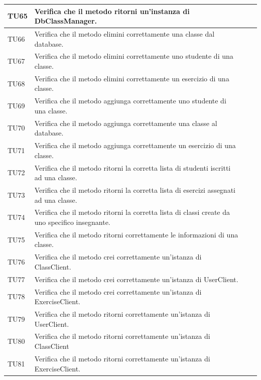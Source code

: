 \begin{longtable}{|>{\centering\arraybackslash}m{1.6cm}|>{\centering\arraybackslash}m{6.41cm}|>{\centering\arraybackslash}m{3.1cm}| c |}
		TU65 & Verifica che il metodo ritorni un'instanza di DbClassManager.  \\ \hline
		TU66 & Verifica che il metodo elimini correttamente una classe dal database.  \\ \hline
		TU67 & Verifica che il metodo elimini correttamente uno studente di una classe.  \\ \hline
		TU68 & Verifica che il metodo elimini correttamente un esercizio di una classe.  \\ \hline
		TU69 & Verifica che il metodo aggiunga correttamente uno studente di una classe.  \\ \hline
		TU70 & Verifica che il metodo aggiunga correttamente una classe al database. \\ \hline
		TU71 & Verifica che il metodo aggiunga correttamente un esercizio di una classe.  \\ \hline
		TU72 & Verifica che il metodo ritorni la corretta lista di studenti iscritti ad una classe.  \\ \hline
		TU73 & Verifica che il metodo ritorni la corretta lista di esercizi assegnati ad una classe.  \\ \hline
		TU74 & Verifica che il metodo ritorni la corretta lista di classi create da uno specifico insegnante.  \\ \hline
		TU75 & Verifica che il metodo ritorni correttamente le informazioni di una classe.  \\ \hline
		
		TU76 & Verifica che il metodo crei correttamente un'istanza di ClassClient.  \\ \hline
		TU77 & Verifica che il metodo crei correttamente un'istanza di UserClient.  \\ \hline
		TU78 & Verifica che il metodo crei correttamente un'istanza di ExerciseClient.  \\ \hline
		TU79 & Verifica che il metodo ritorni correttamente un'istanza di UserClient.  \\ \hline
		TU80 & Verifica che il metodo ritorni correttamente un'istanza di ClassClient  \\ \hline
		TU81 & Verifica che il metodo ritorni correttamente un'istanza di ExerciseClient.  \\ \hline
		

\end{longtable}
